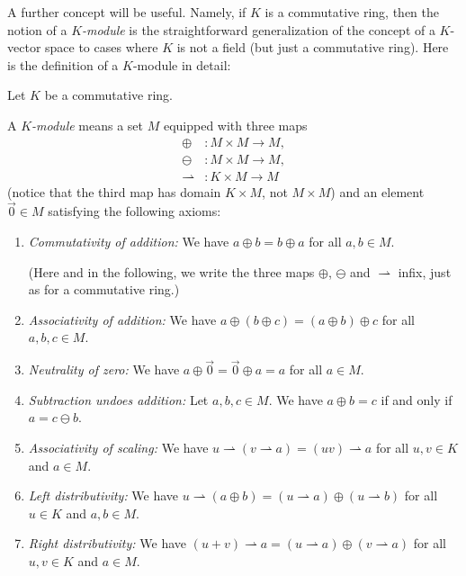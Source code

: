 A further concept will be useful. Namely, if $K$ is a commutative ring, then
the notion of a $K$\emph{-module} is the straightforward generalization of the
concept of a $K$-vector space to cases where $K$ is not a field (but just a
commutative ring). Here is the definition of a $K$-module in detail:

\begin{definition}
\label{def.alg.module}Let $K$ be a commutative ring.

A $K$\emph{-module} means a set $M$ equipped with three maps
\begin{align*}
\oplus &  :M\times M\rightarrow M,\\
\ominus &  :M\times M\rightarrow M,\\
\rightharpoonup &  :K\times M\rightarrow M
\end{align*}
(notice that the third map has domain $K\times M$, not $M\times M$) and an
element $\overrightarrow{0}\in M$ satisfying the following axioms:

\begin{enumerate}
\item \emph{Commutativity of addition:} We have $a\oplus b=b\oplus a$ for all
$a,b\in M$.

(Here and in the following, we write the three maps $\oplus$, $\ominus$ and
$\rightharpoonup$ infix, just as for a commutative ring.)

\item \emph{Associativity of addition:} We have $a\oplus\left(  b\oplus
c\right)  =\left(  a\oplus b\right)  \oplus c$ for all $a,b,c\in M$.

\item \emph{Neutrality of zero:} We have $a\oplus\overrightarrow{0}%
=\overrightarrow{0}\oplus a=a$ for all $a\in M$.

\item \emph{Subtraction undoes addition:} Let $a,b,c\in M$. We have $a\oplus
b=c$ if and only if $a=c\ominus b$.

\item \emph{Associativity of scaling:} We have $u\rightharpoonup\left(
v\rightharpoonup a\right)  =\left(  uv\right)  \rightharpoonup a$ for all
$u,v\in K$ and $a\in M$.

\item \emph{Left distributivity:} We have $u\rightharpoonup\left(  a\oplus
b\right)  =\left(  u\rightharpoonup a\right)  \oplus\left(  u\rightharpoonup
b\right)  $ for all $u\in K$ and $a,b\in M$.

\item \emph{Right distributivity:} We have $\left(  u+v\right)
\rightharpoonup a=\left(  u\rightharpoonup a\right)  \oplus\left(
v\rightharpoonup a\right)  $ for all $u,v\in K$ and $a\in M$.


\end{enumerate}
\end{definition}
